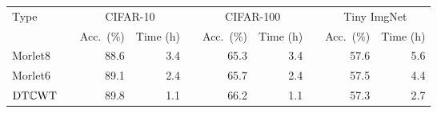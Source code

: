 \begin{table}[t]
  \centering
  \label{tab:ch3:comparison}
  \begin{tabular}{lcrrcrrcrr}
    \toprule
    Type & \phantom{abc} & \multicolumn{2}{c}{CIFAR-10} && \multicolumn{2}{c}{CIFAR-100} 
         && \multicolumn{2}{c}{Tiny ImgNet} \\\cmidrule{3-4}\cmidrule{6-7}\cmidrule{9-10}
         && Acc.\ (\%) & Time (h) && Acc.\ (\%) & Time (h) && Acc.\ (\%) & Time (h)\\\midrule
    Morlet8 && 88.6 & 3.4 && 65.3 & 3.4 && 57.6 & 5.6 \\
    Morlet6 && 89.1 & 2.4 && 65.7 & 2.4 && 57.5 & 4.4 \\
    $\mathrm{DT}\mathbb{C}\mathrm{WT}$ && 89.8 & 1.1 && 66.2 & 1.1 && 57.3 & 2.7 \\\bottomrule
  \end{tabular}
\end{table}
